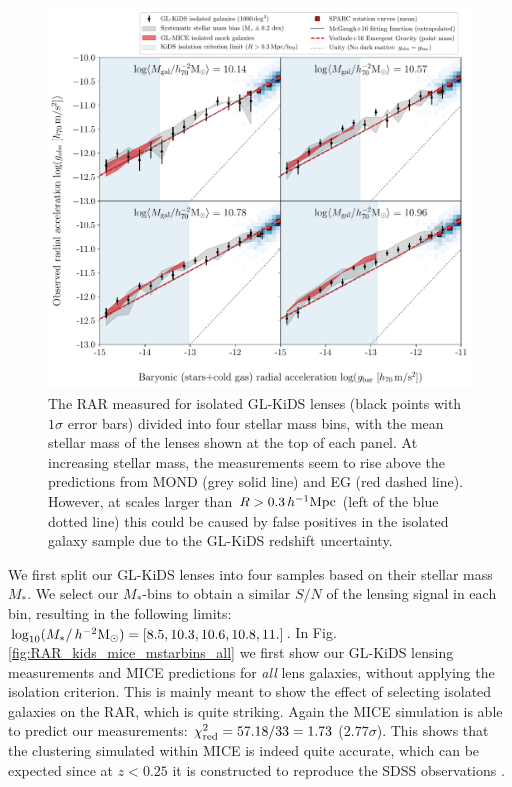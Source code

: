 \documentclass[usenatbib]{mnras}
\newcommand{\hmsun}{\,h^{-2} {\rm M_\odot}}
\newcommand{\hMpc}{\, h^{-1}{\rm{Mpc}} }
\newcommand{\un}[1]{_{\rm #1}}
\begin{document}
\begin{figure}
	\includegraphics[width=\textwidth]{Figures/RAR_KiDS+MICE+Verlinde_4-massbins_isolated.pdf}
	\caption{The RAR measured for isolated GL-KiDS lenses (black points with $1\sigma$ error bars) divided into four stellar mass bins, with the mean stellar mass of the lenses shown at the top of each panel. At increasing stellar mass, the measurements seem to rise above the predictions from MOND (grey solid line) and EG (red dashed line). However, at scales larger than $R > 0.3 \hMpc$ (left of the blue dotted line) this could be caused by false positives in the isolated galaxy sample due to the GL-KiDS redshift uncertainty.}
	\label{fig:RAR_kids_mice_mstarbins}
\end{figure}

We first split our GL-KiDS lenses into four samples based on their stellar mass $M_*$. We select our $M_*$-bins to obtain a similar $S/N$ of the lensing signal in each bin, resulting in the following limits: $\log_{10}(M_*/\hmsun) = [8.5,10.3,10.6,10.8,11.]$. In Fig. \ref{fig:RAR_kids_mice_mstarbins_all} we first show our GL-KiDS lensing measurements and MICE predictions for \emph{all} lens galaxies, without applying the isolation criterion. This is mainly meant to show the effect of selecting isolated galaxies on the RAR, which is quite striking. Again the MICE simulation is able to predict our measurements: $\chi\un{red}^2 = 57.18 / 33 = 1.73$ ($2.77 \sigma$). This shows that the clustering simulated within MICE is indeed quite accurate, which can be expected since at $z<0.25$ it is constructed to reproduce the SDSS observations \cite[]{zehavi2011}.
\end{document}
